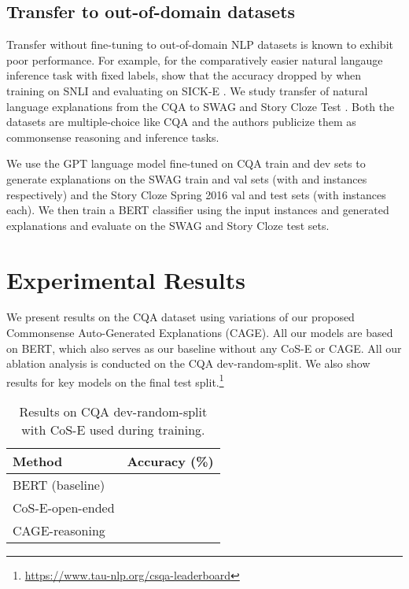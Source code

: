 \documentclass[11pt,a4paper]{article}
\begin{document}
\subsection{Transfer to out-of-domain datasets}
\vspace{-0.2cm}
Transfer without fine-tuning to out-of-domain NLP datasets is known to exhibit poor performance. For example, for the comparatively easier natural langauge inference task with fixed labels, \citet{bowman2015large} show that the accuracy dropped by  when training on SNLI and evaluating on SICK-E \citep{marelli-etal-2014-sick}. We study transfer of natural language explanations from the CQA to SWAG \citep{zellers2018swag} and Story Cloze Test \citep{mostafazadeh-EtAl:2016:N16-1}. Both the datasets are multiple-choice like CQA and the authors publicize them as commonsense reasoning and inference tasks. 

We use the GPT language model fine-tuned on CQA train and dev sets to generate explanations on the SWAG train and val sets (with  and  instances respectively) and the Story Cloze Spring 2016 val and test sets (with  instances each). We then train a BERT classifier using the input instances and generated explanations and evaluate on the SWAG and Story Cloze test sets.  \section{Experimental Results}
\vspace{-0.2cm}
\label{experiments}
We present results on the CQA dataset using variations of our proposed Commonsense Auto-Generated Explanations (CAGE).
All our models are based on BERT, which also serves as our baseline without any CoS-E or CAGE.
All our ablation analysis is conducted on the CQA dev-random-split. 
We also show results for key models on the final test split.\footnote{\url{https://www.tau-nlp.org/csqa-leaderboard}} 

\begin{table}[!ht]
\centering
\small
\begin{tabular}{lc}
\toprule
\textbf{Method}&\textbf{Accuracy (\%)}\\
\midrule
BERT (baseline) & \\
CoS-E-open-ended &\\
CAGE-reasoning &  \\
\bottomrule
\end{tabular}
\caption{Results on CQA dev-random-split with CoS-E used during training.
}
\vspace{-0.5cm}
\label{table:results-dev-noexpl}
\end{table}
\end{document}
